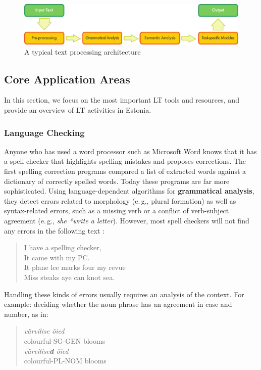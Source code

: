 \documentclass[]{../metanetpaper}
\begin{document}
\begin{multicols}{2}
\begin{figure}[htb]
  \center
  \includegraphics[width=\textwidth]{../_media/english/text_processing_app_architecture}
  \caption{A typical text processing architecture}
  \label{fig:textprocessingarch_en}
\end{figure}

\subsection{Core Application Areas}

In this section, we focus on the most important LT tools and resources, and provide an overview of LT activities in Estonia. 

\subsubsection{Language Checking}

Anyone who has used a word processor such as Microsoft Word knows that it has a spell checker that highlights spelling mistakes and proposes corrections. The first spelling correction programs compared a list of extracted words against a dictionary of correctly spelled words. Today these programs are far more sophisticated. Using language-dependent algorithms for \textbf{grammatical analysis}, they detect errors related to morphology (e.\,g., plural formation) as well as syntax-related errors, such as a missing verb or a conflict of verb-subject agreement (e.\,g., \textit{she *write a letter}). However, most spell checkers will not find any errors in the following text \cite{zar1}:

\begin{quote}
  I have a spelling checker,\\
  It came with my PC.\\
  It plane lee marks four my revue\\
  Miss steaks aye can knot sea.
\end{quote}

Handling these kinds of errors usually requires an analysis of the context. For example: deciding whether the noun phrase has an agreement in case and number, as in:
\begin{quote}
 \textit {värvilise õied}\\ 
 colourful-SG-GEN blooms\\
 \textit {värvilise\textbf{d} õied}\\
 colourful-PL-NOM blooms
\end{quote}


\end{multicols}
\end{document}
